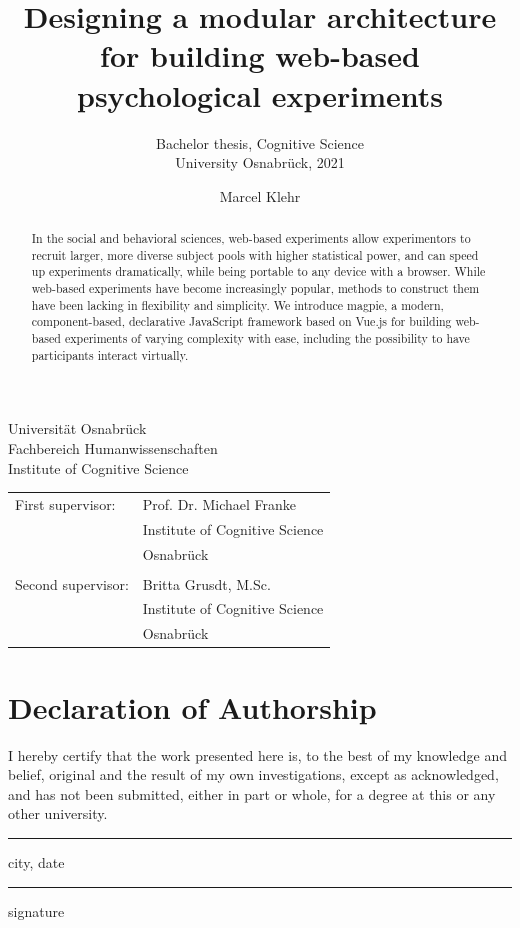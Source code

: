 \documentclass[a4paper,11pt]{scrreprt}
\title{Designing a modular architecture for building web-based psychological experiments}
\subtitle{
Bachelor thesis, Cognitive Science \\
University Osnabrück, 2021}
\author{Marcel Klehr}
\newcommand{\namesigdate}[1][5cm]{%
	\vspace{5cm}
	{\setlength{\parindent}{0cm}
	\begin{minipage}{0.3\textwidth}
		\hrule 
		\vspace{0.5cm}
		{\small city, date}
	\end{minipage}
	 \hfill
	\begin{minipage}{0.3\textwidth}
		\hrule
		\vspace{0.5cm}
	    {\small signature}
	\end{minipage}
	}
}
\begin{document}
\begin{titlepage}
	\begin{flushleft}
		Universität Osnabrück\\
		Fachbereich Humanwissenschaften\\
		Institute of Cognitive Science
	\end{flushleft}

	\vspace{2cm}
	\vspace{1cm}

	\begin{tabular}{ll}
		First supervisor:  & Prof. Dr. Michael Franke\\
		                   & Institute of Cognitive Science                   \\
		                   & Osnabrück                       \\\\
		Second supervisor: & Britta Grusdt, M.Sc.         \\
		                   & Institute of Cognitive Science \\
		                   & Osnabrück
	\end{tabular}

\end{titlepage}

\chapter*{Declaration of Authorship}
I hereby certify that the work presented here is, to the best of my knowledge and belief, original and the result of my own investigations, except as acknowledged, and has not been submitted, either in part or whole, for a degree at this or any other university.

\namesigdate
\pagebreak


\begin{abstract}
In the social and behavioral sciences, web-based experiments allow experimentors to recruit larger, more diverse subject pools with higher statistical power, and can speed up experiments dramatically, while being portable to any device with a browser. While web-based experiments have become increasingly popular, methods to construct them have been lacking in flexibility and simplicity. We introduce magpie, a modern, component-based, declarative JavaScript framework based on Vue.js for building web-based experiments of varying complexity with ease, including the possibility to have participants interact virtually.
\end{abstract}
\newpage 
\end{document}
